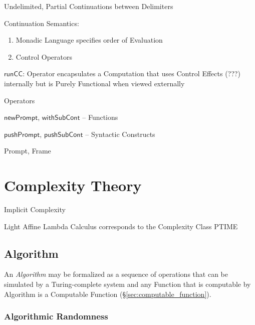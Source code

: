 Undelimited, Partial Continuations between Delimiters

Continuation Semantics:
\begin{enumerate}
  \item Monadic Language specifies order of Evaluation
  \item Control Operators
\end{enumerate}

$\mathsf{runCC}$: Operator encapsulates a Computation that uses Control
Effects (???) internally but is Purely Functional when viewed
externally %

Operators

$\mathsf{newPrompt}$,
$\mathsf{withSubCont}$ -- Functions

$\mathsf{pushPrompt}$,
$\mathsf{pushSubCont}$ -- Syntactic Constructs

Prompt, Frame



\section{Complexity Theory}\label{sec:complexity_theory}

Implicit Complexity

Light Affine Lambda Calculus corresponds to the Complexity Class PTIME



\subsection{Algorithm}\label{sec:algorithm}

An \emph{Algorithm} may be formalized as a sequence of operations that
can be simulated by a Turing-complete system and any Function that is
computable by Algorithm is a Computable Function
(\S\ref{sec:computable_function}).



\subsubsection{Algorithmic Randomness}\label{sec:algorithmic_randomness}



